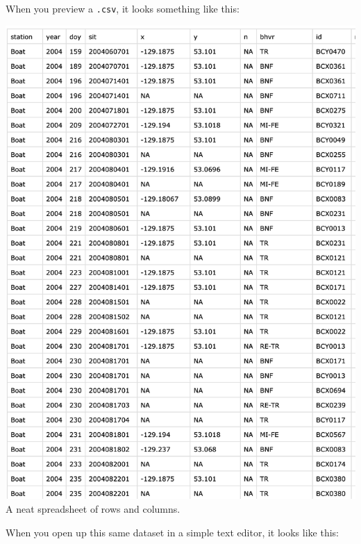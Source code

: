 \documentclass[
]{book}
\begin{document}
When you preview a \texttt{.csv}, it looks something like this:

\includegraphics{img/csv.png}
A neat spreadsheet of rows and columns.

When you open up this same dataset in a simple text editor, it looks like this:
\end{document}
